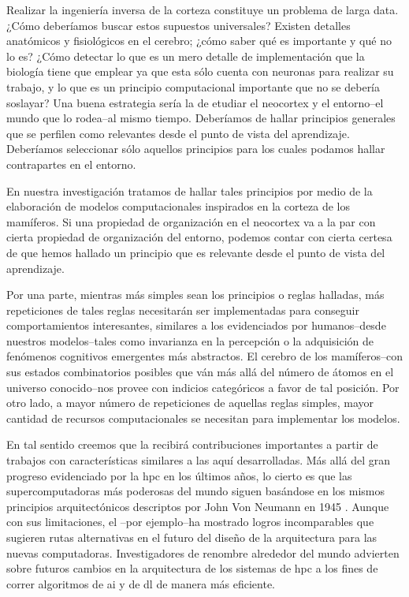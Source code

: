 Realizar la ingeniería inversa de la corteza constituye un problema de larga data.
¿Cómo deberíamos buscar estos supuestos universales?
Existen detalles anatómicos y fisiológicos en el cerebro; ¿cómo saber qué es importante y qué no lo es?
¿Cómo detectar lo que es un mero detalle de implementación que la biología tiene que emplear ya que esta sólo cuenta con neuronas
para realizar su trabajo, y lo que es un principio computacional importante que no se debería soslayar?
Una buena estrategia sería la de etudiar el neocortex y el entorno--el mundo que lo rodea--al mismo tiempo.
Deberíamos de hallar principios generales que se perfilen como relevantes desde el punto de vista del aprendizaje.
Deberíamos seleccionar sólo aquellos principios para los cuales podamos hallar contrapartes en el entorno.

En nuestra investigación tratamos de hallar tales principios por medio de la elaboración de modelos computacionales inspirados en la corteza de los mamíferos.
Si una propiedad de organización en el neocortex va a la par con cierta propiedad de organización del entorno, podemos contar con cierta certesa
de que hemos hallado un principio que es relevante desde el punto de vista del aprendizaje.

Por una parte, mientras más simples sean los principios o reglas halladas, más repeticiones de tales reglas necesitarán ser implementadas
para conseguir comportamientos interesantes, similares a los evidenciados por humanos--desde nuestros modelos--tales como invarianza en la percepción o la adquisición de fenómenos cognitivos emergentes más abstractos.
El cerebro de los mamíferos--con sus estados combinatorios posibles que ván más allá del número de átomos en
el universo conocido--nos provee con indicios categóricos a favor de tal posición.
Por otro lado, a mayor número de repeticiones de aquellas reglas simples, mayor cantidad de recursos computacionales
se necesitan para implementar los modelos.



En tal sentido creemos que la   recibirá contribuciones importantes a partir de trabajos con características similares a las aquí desarrolladas.
Más allá del gran progreso evidenciado por la \gls{hpc} en los últimos años, lo cierto es que las supercomputadoras más poderosas del mundo
siguen basándose en los mismos principios arquitectónicos descriptos por John Von Neumann en 1945 \cite{10.1109/85.238389}.
Aunque con sus limitaciones, el --por ejemplo--ha mostrado logros incomparables
que sugieren rutas alternativas en el futuro del diseño de la arquitectura para las nuevas computadoras.
Investigadores de renombre alrededor del mundo advierten sobre futuros cambios en la arquitectura de los
sistemas de \gls{hpc} a los fines de correr algoritmos de \gls{ai} y de \gls{dl} de manera más eficiente.

